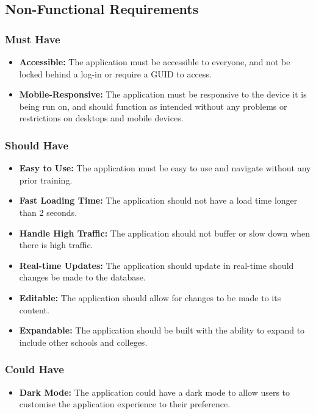 \documentclass{l4proj}
\begin{document}
\subsection{Non-Functional Requirements}
\subsubsection{Must Have}
\begin{itemize}
    \item \textbf{Accessible:} The application must be accessible to everyone, and not be locked behind a log-in or require a GUID to access.
    \item \textbf{Mobile-Responsive:} The application must be responsive to the device it is being run on,  and should function as intended without any problems or restrictions on desktops and mobile devices.
\end{itemize}

\subsubsection{Should Have}
\begin{itemize}
    \item \textbf{Easy to Use:} The application must be easy to use and navigate without any prior training.
    \item \textbf{Fast Loading Time:} The application should not have a load time longer than 2 seconds.
    \item \textbf{Handle High Traffic:} The application should not buffer or slow down when there is high traffic.
    \item \textbf{Real-time Updates:} The application should update in real-time should changes be made to the database.
    \item \textbf{Editable:} The application should allow for changes to be made to its content.
    \item \textbf{Expandable:} The application should be built with the ability to expand to include other schools and colleges.
\end{itemize}

\subsubsection{Could Have}
\begin{itemize}
    \item \textbf{Dark Mode:} The application could have a dark mode to allow users to customise the application experience to their preference.
\end{itemize}
\end{document}
